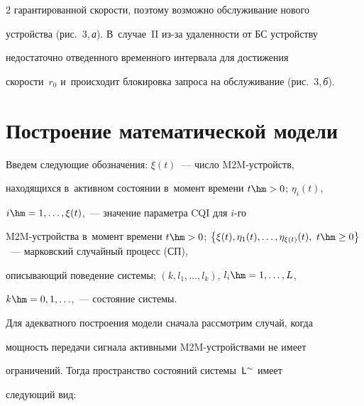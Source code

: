 \begin{multicols}{2}
гарантированной скорости, поэтому возможно обслуживание нового 


устройства (рис.~3,\,\textit{а}). В~случае~II из-за удаленности от БС устройству 


недостаточно отведенного временн$\acute{\mbox{о}}$го интервала для достижения 


скорости~$r_0$ и~происходит блокировка запроса на обслуживание (рис.~3,\,\textit{б}).


  








\vspace*{-6pt}








\section{Построение математической модели}





  Введем следующие обозначения: $\xi(t)$~--- чис\-ло M2M-устройств, 


находящихся в~активном состоянии в~момент времени $t\hm> 0$; $\eta_i(t)$, 


$i\hm=1,\ldots , \xi(t)$,~--- значение параметра CQI для \mbox{$i$-го} 


 M2M-устрой\-ст\-ва в~момент времени $t\hm> 0$; $\left\{ \xi(t),\eta_1(t),\ldots , 


\eta_{\xi(t)}(t),\ t\hm\geq 0\right\}$~--- марковский случайный процесс (СП), 


описывающий поведение системы; $(k, l_1, \ldots , l_k)$, $l_i\hm=1, \ldots , L$, 


$k\hm=0,1,\ldots$,~--- состояние системы. 


  


  Для адекватного построения модели сначала рассмотрим случай, когда 


мощность передачи сигнала активными M2M-устрой\-ст\-ва\-ми не имеет 


ограничений. Тогда пространство состояний системы~${\sf L}^{\sim}$ имеет 


следующий вид:


  \begin{multline*}



\end{multline*}
\end{multicols}
